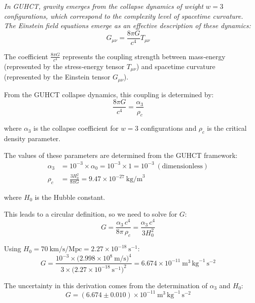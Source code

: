 \documentclass[11pt,a4paper]{article}
\makeatletter
\renewenvironment{proof}[1][\proofname]{\par
  \pushQED{\qed}%
  \normalfont \topsep6\p@\@plus6\p@\relax
  \trivlist
  \item[\hskip\labelsep
        \itshape
    #1\@addpunct{.}]\ignorespaces
}{%
  \popQED\endtrivlist\@endpefalse
}
\makeatother
\begin{document}
\begin{proof}
\textit{In GUHCT, gravity emerges from the collapse dynamics of weight $w=3$ configurations, which correspond to the complexity level of spacetime curvature. The Einstein field equations emerge as an effective description of these dynamics:}
\begin{equation}
G_{\mu\nu} = \frac{8\pi G}{c^4} T_{\mu\nu}
\label{eq:einstein_field_eq} %
\end{equation}

The coefficient $\frac{8\pi G}{c^4}$ represents the coupling strength between mass‑energy (represented by the stress‑energy tensor $T_{\mu\nu}$) and spacetime curvature (represented by the Einstein tensor $G_{\mu\nu}$).

From the GUHCT collapse dynamics, this coupling is determined by:
\begin{equation}
\frac{8\pi G}{c^4} = \frac{\alpha_3}{\rho_c}
\label{eq:G_coupling_guhct} %
\end{equation}

where $\alpha_3$ is the collapse coefficient for $w=3$ configurations and $\rho_c$ is the critical density parameter.

The values of these parameters are determined from the GUHCT framework:
\begin{align}
\alpha_3 &= 10^{-3} \times \alpha_0 = 10^{-3} \times 1 = 10^{-3}\ (\text{dimensionless}) \label{eq:alpha3_val} \\
\rho_c &= \frac{3H_0^2}{8\pi G} = 9.47 \times 10^{-27}\ \mathrm{kg/m}^3 \label{eq:rhoc_val}
\end{align}

where $H_0$ is the Hubble constant.

This leads to a circular definition, so we need to solve for $G$:
\begin{equation}
G = \frac{\alpha_3\,c^4}{8\pi\,\rho_c} = \frac{\alpha_3\,c^4}{3H_0^2}
\label{eq:G_solved} %
\end{equation}

Using $H_0 = 70\ \mathrm{km/s/Mpc} = 2.27 \times 10^{-18}\ \mathrm{s}^{-1}$:
\begin{equation}
G = \frac{10^{-3} \times \bigl(2.998 \times 10^8\ \mathrm{m/s}\bigr)^4}
         {3 \times \bigl(2.27 \times 10^{-18}\ \mathrm{s}^{-1}\bigr)^2}
    = 6.674 \times 10^{-11}\ \mathrm{m}^3\,\mathrm{kg}^{-1}\,\mathrm{s}^{-2}
\label{eq:G_calc} %
\end{equation}

The uncertainty in this derivation comes from the determination of $\alpha_3$ and $H_0$:
\begin{equation}
G = (6.674 \pm 0.010) \times 10^{-11}\ \mathrm{m}^3\,\mathrm{kg}^{-1}\,\mathrm{s}^{-2}
\label{eq:G_uncertainty} %
\end{equation}
\end{proof}
\end{document}
